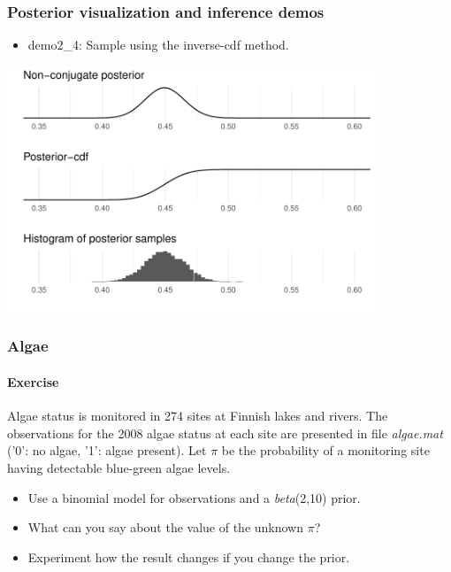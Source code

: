 \documentclass[10pt,handout]{beamer}
\begin{document}
\begin{frame}
  \frametitle{Posterior visualization and inference demos}

  \begin{itemize}
  \item demo2\_4: Sample using the inverse-cdf method.
  \end{itemize}
  \includegraphics[width=11cm]{figs/demo2_4b.pdf}
\end{frame}

\begin{frame}
  \frametitle{Algae}
  \framesubtitle{Exercise}

Algae status is monitored in 274 sites at Finnish lakes and rivers.
The observations for the 2008 algae status at each site are presented
in file \emph{algae.mat} ('0': no algae, '1': algae present).
Let $\pi$ be the probability of a monitoring site having detectable
blue-green algae levels.

\begin{itemize}
\item Use a binomial model for observations and a \emph{beta}(2,10) prior.
\item What can you say about the value of the unknown $\pi$?
\item Experiment how the result changes if you change the prior.
\end{itemize}

\end{frame}

\end{document}
